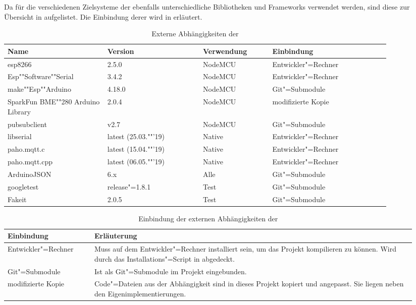 Da für die verschiedenen Zielsysteme der \skfw ebenfalls unterschiedliche Bibliotheken und Frameworks verwendet werden, sind diese zur Übersicht in  aufgelistet.
Die Einbindung derer wird in  erläutert.

\begin{table}[htb]
	\caption{Externe Abhängigkeiten der \skfw}
	\begin{tabular}{|p{0.23\linewidth}|p{0.22\linewidth}|p{0.16\linewidth}|p{0.27\linewidth}|}
		\hline
		Name & Version & Verwendung & Einbindung \\ \hline
		esp8266 & 2.5.0 & NodeMCU & Entwickler"=Rechner \\ \hline
		Esp""Software""Serial & 3.4.2 & NodeMCU & Entwickler"=Rechner \\ \hline
		make""Esp""Arduino & 4.18.0 & NodeMCU & Git"=Submodule \\ \hline
		SparkFun BME""280 Arduino Library & 2.0.4 & NodeMCU & modifizierte Kopie \\ \hline
		pubsubclient & v2.7 & NodeMCU & Git"=Submodule \\ \hline
		libserial & latest (25.03.""'19) & Native & Entwickler"=Rechner \\ \hline
		paho.mqtt.c & latest (15.04.""'19) & Native & Entwickler"=Rechner \\ \hline
		paho.mqtt.cpp & latest (06.05.""'19) & Native & Entwickler"=Rechner \\ \hline
		ArduinoJSON & 6.x & Alle & Git"=Submodule \\ \hline
		googletest & release"=1.8.1 & Test & Git"=Submodule \\ \hline
		Fakeit & 2.0.5 & Test & Git"=Submodule \\ \hline
	\end{tabular}
	\label{tbl:skextfw}
\end{table}

\begin{table}[htb]
	\caption{Einbindung der externen Abhängigkeiten der \skfw}
	\begin{tabular}{|p{0.20\linewidth}|p{0.74\linewidth}|}
		\hline
		Einbindung & Erläuterung \\ \hline
		Entwickler"=Rechner & Muss auf dem Entwickler"=Rechner installiert sein, um das Projekt kompilieren zu können. Wird durch das Installations"=Script in \Fref{sec:sk:stepsToCode} abgedeckt. \\ \hline
		Git"=Submodule & Ist als Git"=Submodule im Projekt eingebunden. \\ \hline
		modifizierte Kopie & Code"=Dateien aus der Abhängigkeit sind in dieses Projekt kopiert und angepasst. Sie liegen neben den Eigenimplementierungen. \\ \hline
	\end{tabular}
	\label{tbl:sklinking}
\end{table}

